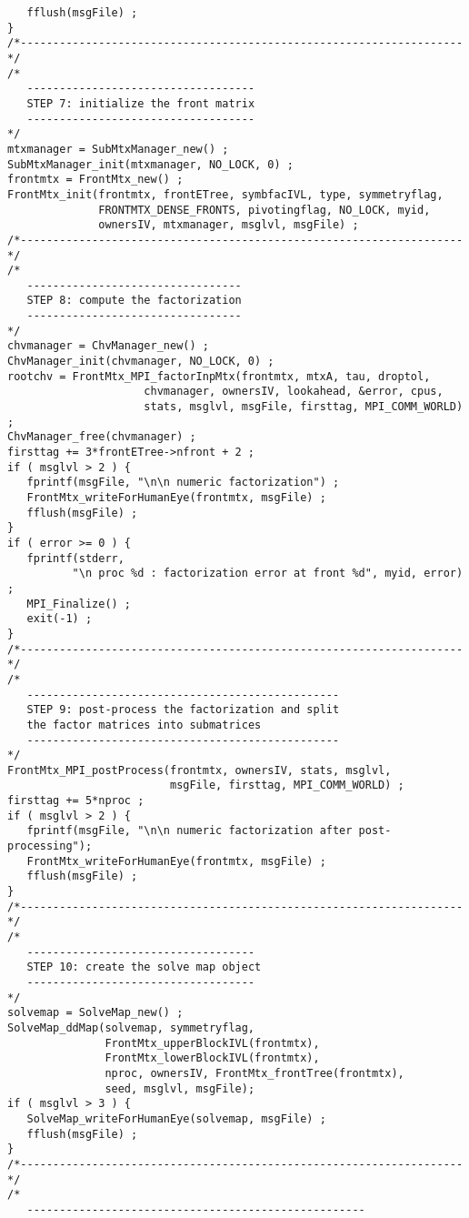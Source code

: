 \begin{verbatim}
   fflush(msgFile) ;
}
/*--------------------------------------------------------------------*/
/*
   -----------------------------------
   STEP 7: initialize the front matrix
   -----------------------------------
*/
mtxmanager = SubMtxManager_new() ;
SubMtxManager_init(mtxmanager, NO_LOCK, 0) ;
frontmtx = FrontMtx_new() ;
FrontMtx_init(frontmtx, frontETree, symbfacIVL, type, symmetryflag,
              FRONTMTX_DENSE_FRONTS, pivotingflag, NO_LOCK, myid,
              ownersIV, mtxmanager, msglvl, msgFile) ;
/*--------------------------------------------------------------------*/
/*
   ---------------------------------
   STEP 8: compute the factorization
   ---------------------------------
*/
chvmanager = ChvManager_new() ;
ChvManager_init(chvmanager, NO_LOCK, 0) ;
rootchv = FrontMtx_MPI_factorInpMtx(frontmtx, mtxA, tau, droptol,
                     chvmanager, ownersIV, lookahead, &error, cpus, 
                     stats, msglvl, msgFile, firsttag, MPI_COMM_WORLD) ;
ChvManager_free(chvmanager) ;
firsttag += 3*frontETree->nfront + 2 ;
if ( msglvl > 2 ) {
   fprintf(msgFile, "\n\n numeric factorization") ;
   FrontMtx_writeForHumanEye(frontmtx, msgFile) ;
   fflush(msgFile) ;
}
if ( error >= 0 ) {
   fprintf(stderr, 
          "\n proc %d : factorization error at front %d", myid, error) ;
   MPI_Finalize() ;
   exit(-1) ;
}
/*--------------------------------------------------------------------*/
/*
   ------------------------------------------------
   STEP 9: post-process the factorization and split 
   the factor matrices into submatrices 
   ------------------------------------------------
*/
FrontMtx_MPI_postProcess(frontmtx, ownersIV, stats, msglvl,
                         msgFile, firsttag, MPI_COMM_WORLD) ;
firsttag += 5*nproc ;
if ( msglvl > 2 ) {
   fprintf(msgFile, "\n\n numeric factorization after post-processing");
   FrontMtx_writeForHumanEye(frontmtx, msgFile) ;
   fflush(msgFile) ;
}
/*--------------------------------------------------------------------*/
/*
   -----------------------------------
   STEP 10: create the solve map object
   -----------------------------------
*/
solvemap = SolveMap_new() ;
SolveMap_ddMap(solvemap, symmetryflag, 
               FrontMtx_upperBlockIVL(frontmtx),
               FrontMtx_lowerBlockIVL(frontmtx),
               nproc, ownersIV, FrontMtx_frontTree(frontmtx), 
               seed, msglvl, msgFile);
if ( msglvl > 3 ) {
   SolveMap_writeForHumanEye(solvemap, msgFile) ;
   fflush(msgFile) ;
}
/*--------------------------------------------------------------------*/
/*
   ----------------------------------------------------

\end{verbatim}
